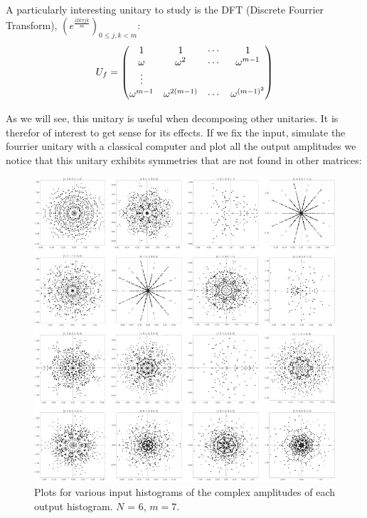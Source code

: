 

A particularly interesting unitary to study is the DFT (Discrete Fourrier Transform), $(e^{\frac{i 2 k \pi j k}{m}})_{0 \leq j,k < m}$:
\[U_{f} = \begin{pmatrix}
            1 & 1 & \cdots & 1 \\
            \omega & \omega^{2} & \cdots & \omega^{m-1} \\
            \vdots \\
            \omega^{m-1} & \omega^{2(m-1)} & \cdots & \omega^{(m-1)^{2}} \\
          \end{pmatrix}\]

As we will see, this unitary is useful when decomposing other unitaries. It is therefor of interest to get sense for its effects. If we fix the input, simulate the fourrier unitary with a classical computer and plot all the output amplitudes we notice that this unitary exhibits symmetries that are not found in other matrices:

\begin{figure}[ht]
  \centering
  \includegraphics{figures/Mandalas.pdf}
  \caption{\label{fig:mandalas} Plots for various input histograms of the complex amplitudes of each output histogram. $N$ = 6, $m = 7$. }
\end{figure}

